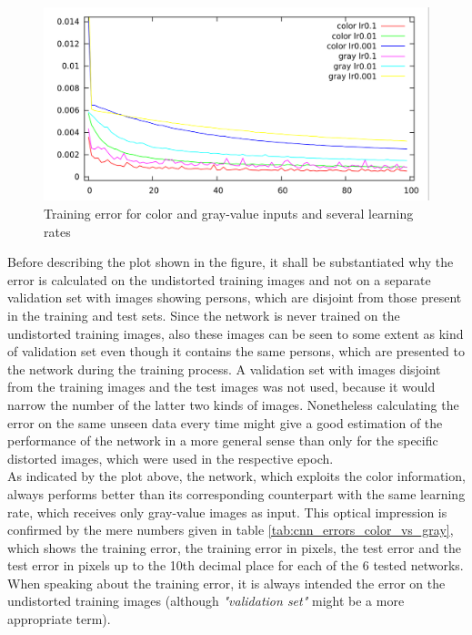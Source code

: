 \documentclass[11pt, a4paper]{article}
\newcommand\q[1]{\emph{"#1"}}
\begin{document}
\begin{figure}[htbp]
	\centering
	\includegraphics[width=\textwidth]{results/cnn_color_vs_gray.png}
	\caption{Training error for color and gray-value inputs and several learning rates}
	\label{fig:cnn_color_vs_gray}
\end{figure}

Before describing the plot shown in the figure, it shall be substantiated why the error is calculated on the undistorted training images and not on a separate validation set with images showing persons, which are disjoint from those present in the training and test sets. Since the network is never trained on the undistorted training images, also these images can be seen to some extent as kind of validation set even though it contains the same persons, which are presented to the network during the training process. A validation set with images disjoint from the training images and the test images was not used, because it would narrow the number of the latter two kinds of images. Nonetheless calculating the error on the same unseen data every time might give a good estimation of the performance of the network in a more general sense than only for the specific distorted images, which were used in the respective epoch.\\
As indicated by the plot above, the network, which exploits the color information, always performs better than its corresponding counterpart with the same learning rate, which receives only gray-value images as input. This optical impression is confirmed by the mere numbers given in table \ref{tab:cnn_errors_color_vs_gray}, which shows the training error, the training error in pixels, the test error and the test error in pixels up to the 10th decimal place for each of the 6 tested networks. When speaking about the training error, it is always intended the error on the undistorted training images (although \q{validation set} might be a more appropriate term).
\end{document}

